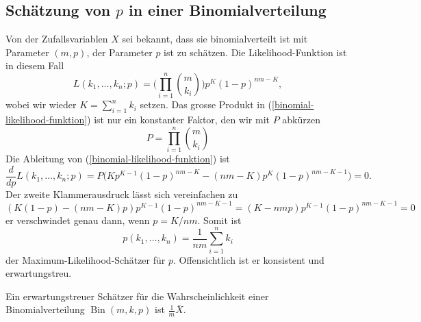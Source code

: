\subsection{Schätzung von \texorpdfstring{$p$}{p} in einer Binomialverteilung}
Von der Zufallsvariablen $X$ sei bekannt, dass sie binomialverteilt ist
mit Parameter $(m, p)$, der Parameter $p$ ist zu schätzen.
Die Likelihood-Funktion ist in diesem Fall
\begin{equation}
L(k_1,\dots,k_n;p)=\biggl(\prod_{i=1}^n\binom{m}{k_i}\biggr)
p^{K}(1-p)^{nm-K},
\label{binomial-likelihood-funktion}
\end{equation}
wobei wir wieder $K=\sum_{i=1}^nk_i$ setzen. 
Das grosse Produkt in (\ref{binomial-likelihood-funktion})
ist nur ein konstanter Faktor, den wir mit $P$ abkürzen
\begin{equation}
P= \prod_{i=1}^n\binom{m}{k_i}
\end{equation}
Die Ableitung von (\ref{binomial-likelihood-funktion}) ist
\begin{equation}
\frac{d}{dp}L(k_1,\dots,k_n;p)=P
\bigl(Kp^{K-1}(1-p)^{nm-K}-(nm-K)p^K(1-p)^{nm-K-1}\bigr)=0.
\end{equation}
Der zweite Klammerausdruck lässt sich vereinfachen zu
\[
(K(1-p)-(nm-K)p)p^{K-1}(1-p)^{nm-K-1}=
(K-nmp)p^{K-1}(1-p)^{nm-K-1}=0
\]
er verschwindet genau dann, wenn $p=K/nm$.
Somit ist
\begin{equation}
p(k_1,\dots,k_n)=\frac1{nm}\sum_{i=1}^nk_i
\end{equation}
der Maximum-Likelihood-Schätzer für $p$.
Offensichtlich ist er konsistent
und erwartungstreu.
\begin{satz}
Ein erwartungstreuer Schätzer für die Wahrscheinlichkeit einer
Binomialverteilung $\operatorname{Bin}(m,k,p)$ ist
$\frac1{m}\bar X$.
\end{satz}

